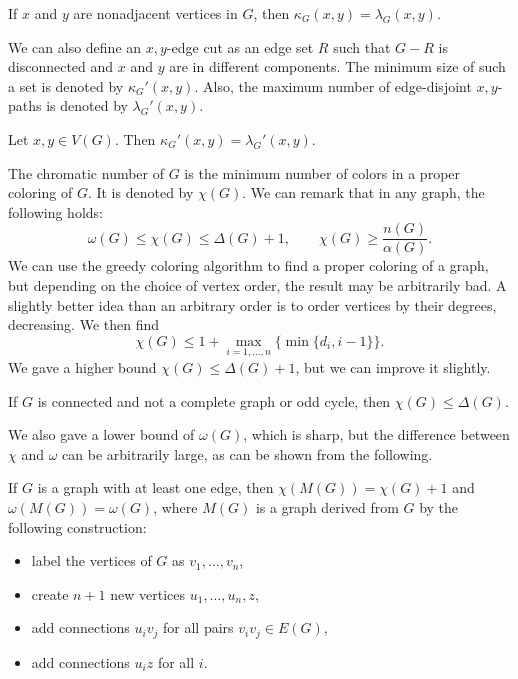 \begin{theorem}
  If $x$ and $y$ are nonadjacent vertices in $G$, then $\kappa_G(x,y) =
  \lambda_G(x,y)$.
\end{theorem}

We can also define an $x,y$-edge cut as an edge set $R$ such that $G - R$ is
disconnected and $x$ and $y$ are in different components.
The minimum size of such a set is denoted by $\kappa_G'(x,y)$.
Also, the maximum number of edge-disjoint $x,y$-paths is denoted by
$\lambda_G'(x,y)$.

\begin{theorem}
  Let $x,y \in V(G)$.
  Then $\kappa_G'(x,y) = \lambda_G'(x,y)$.
\end{theorem}


The chromatic number of $G$ is the minimum number of colors in a proper coloring
of $G$.
It is denoted by $\chi(G)$.
We can remark that in any graph, the following holds:
\[
  \omega(G) \le \chi(G) \le \Delta(G) + 1,
  \qquad
  \chi(G) \ge \frac{n(G)}{\alpha(G)}.
\]
We can use the greedy coloring algorithm to find a proper coloring of a graph,
but depending on the choice of vertex order, the result may be arbitrarily bad.
A slightly better idea than an arbitrary order is to order vertices by their
degrees, decreasing.
We then find
\[
  \chi(G) \le 1 + \max_{i=1, \ldots, n} \{ \min \{ d_i, i-1 \} \}.
\]
We gave a higher bound $\chi(G) \le \Delta(G) + 1$, but we can improve it
slightly.

\begin{theorem}[Brooks]
  If $G$ is connected and not a complete graph or odd cycle, then $\chi(G) \le
  \Delta(G)$.
\end{theorem}

We also gave a lower bound of $\omega(G)$, which is sharp, but the difference
between $\chi$ and $\omega$ can be arbitrarily large, as can be shown from the
following.

\begin{theorem}
  If $G$ is a graph with at least one edge, then $\chi(M(G)) = \chi(G) + 1$ and
  $\omega(M(G)) = \omega(G)$, where $M(G)$ is a graph derived from $G$ by the
  following construction:
  \begin{itemize}
  \item label the vertices of $G$ as $v_1, \ldots, v_n$,
  \item create $n+1$ new vertices $u_1, \ldots, u_n, z$,
  \item add connections $u_i v_j$ for all pairs $v_i v_j \in E(G)$,
  \item add connections $u_i z$ for all $i$.
  \end{itemize}
\end{theorem}

